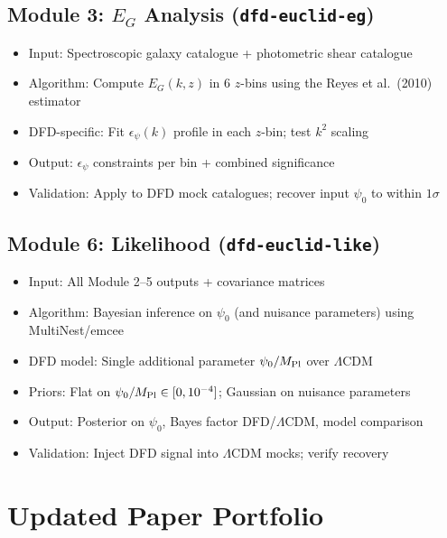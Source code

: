 \documentclass[11pt,a4paper]{article}
\begin{document}
\subsection{Module 3: $E_G$ Analysis (\texttt{dfd-euclid-eg})}
\begin{itemize}[nosep]
\item Input: Spectroscopic galaxy catalogue + photometric shear catalogue
\item Algorithm: Compute $E_G(k,z)$ in 6 $z$-bins using the Reyes et al.\ (2010) estimator
\item DFD-specific: Fit $\epsilon_\psi(k)$ profile in each $z$-bin; test $k^2$ scaling
\item Output: $\epsilon_\psi$ constraints per bin + combined significance
\item Validation: Apply to DFD mock catalogues; recover input $\psi_0$ to within $1\sigma$
\end{itemize}

\subsection{Module 6: Likelihood (\texttt{dfd-euclid-like})}
\begin{itemize}[nosep]
\item Input: All Module 2--5 outputs + covariance matrices
\item Algorithm: Bayesian inference on $\psi_0$ (and nuisance parameters) using MultiNest/emcee
\item DFD model: Single additional parameter $\psi_0/M_{\rm Pl}$ over $\Lambda$CDM
\item Priors: Flat on $\psi_0/M_{\rm Pl} \in [0, 10^{-4}]$; Gaussian on nuisance parameters
\item Output: Posterior on $\psi_0$, Bayes factor DFD/$\Lambda$CDM, model comparison
\item Validation: Inject DFD signal into $\Lambda$CDM mocks; verify recovery
\end{itemize}

\section{Updated Paper Portfolio}
\end{document}
